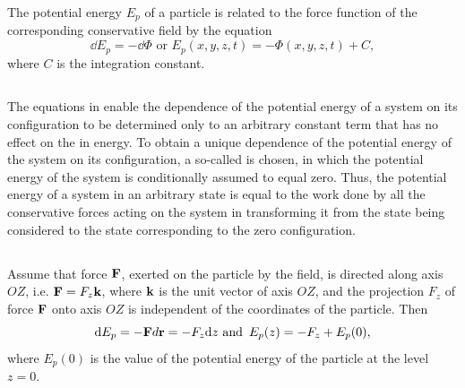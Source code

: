 The potential energy $E_{p}$ of a particle is related to the force function  of the corresponding conservative field by the equation 
\begin{equation*}%
\dd E_{p} = - \dd \Phi \,\, \textrm{or}\,\, E_{p} (x, y, z, t) = -\Phi (x, y, z, t) + C,
\end{equation*}
where $C$ is the integration constant.

\subsection{}\label{3.3.2} The equations in  enable the dependence of the po­tential energy of a system on its configuration to be determined only to an arbitrary constant term that has no effect on the  in energy. To obtain a unique dependence of the potenti­al energy of the system on its configuration, a so-called  is chosen, in which the potential energy of the system is conditionally assumed to equal zero. Thus, the po­tential energy of a system in an arbitrary state is equal to the work done by all the conservative forces acting on the system in transforming it from the state being considered to the state corresponding to the zero configuration.

\subsection{}\label{3.3.3}   Assume that force $\vb{F}$, exerted on the particle by the field, is directed along axis $OZ$, i.e. $\vb{F} = F_{z}\vb{k}$, where $\vb{k}$ is the unit vector of axis $OZ$, and the projection $F_{z}$ of force $\vb{F}$ onto axis $OZ$ is independent of the coordinates of the particle. Then
\begin{equation*}%
\dd E_{p} = -\vb{F} d\vb{r} = -F_{z} \dd z\,\, \textrm{and} \,\ E_{p} (z) = -F_{z} + E_{p} (0),
\end{equation*}
where $E_{p} (0)$ is the value of the potential energy of the particle at the level $z = 0$.

